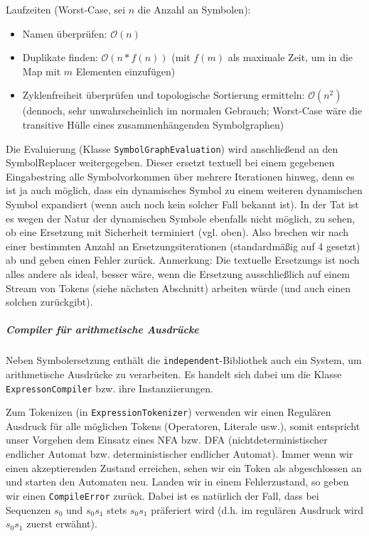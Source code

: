 Laufzeiten (Worst-Case, sei $n$ die Anzahl an Symbolen): \begin{itemize} \item
Namen überprüfen: $\mathcal{O}(n)$ \item Duplikate finden:
$\mathcal{O}(n*f(n))$ (mit $f(m)$ als maximale Zeit, um in die Map mit $m$
Elementen einzufügen) \item Zyklenfreiheit überprüfen und topologische
Sortierung ermitteln: $\mathcal{O}(n^2)$ (dennoch, sehr unwahrscheinlich im
normalen Gebrauch; Worst-Case wäre die transitive Hülle eines zusammenhängenden
Symbolgraphen) \end{itemize}

Die Evaluierung (Klasse \texttt{SymbolGraphEvaluation}) wird anschließend an den
SymbolReplacer weitergegeben. Dieser ersetzt textuell bei einem gegebenen
Eingabestring alle Symbolvorkommen über mehrere Iterationen hinweg, denn es ist
ja auch möglich, dass ein dynamisches Symbol zu einem weiteren dynamischen
Symbol expandiert (wenn auch noch kein solcher Fall bekannt ist). In der Tat ist
es wegen der Natur der dynamischen Symbole ebenfalls nicht möglich, zu sehen, ob
eine Ersetzung mit Sicherheit terminiert (vgl. oben). Also brechen wir nach
einer bestimmten Anzahl an Ersetzungsiterationen (standardmäßig auf 4 gesetzt)
ab und geben einen Fehler zurück. Anmerkung: Die textuelle Ersetzungs ist noch
alles andere als ideal, besser wäre, wenn die Ersetzung ausschließlich auf einem
Stream von Tokens (siehe nächsten Abschnitt) arbeiten würde (und auch einen
solchen zurückgibt).

\subparagraph{Compiler für arithmetische Ausdrücke} Neben Symbolersetzung
enthält die \texttt{independent}-Bibliothek auch ein System, um arithmetische
Ausdrücke zu verarbeiten. Es handelt sich dabei um die Klasse
\texttt{ExpressonCompiler} bzw. ihre Instanziierungen.

Zum Tokenizen (in \texttt{ExpressionTokenizer}) verwenden wir einen Regulären
Ausdruck für alle möglichen Tokens (Operatoren, Literale usw.), somit entspricht
unser Vorgehen dem Einsatz eines NFA bzw. DFA (nichtdeterministischer endlicher
Automat bzw. deterministischer endlicher Automat). Immer wenn wir einen
akzeptierenden Zustand erreichen, sehen wir ein Token als abgeschlossen an und
starten den Automaten neu. Landen wir in einem Fehlerzustand, so geben wir einen
\texttt{CompileError} zurück. Dabei ist es natürlich der Fall, dass bei
Sequenzen $s_0$ und $s_0s_1$ stets $s_0s_1$ präferiert wird (d.h. im
regulären Ausdruck wird $s_0s_1$ zuerst erwähnt).

